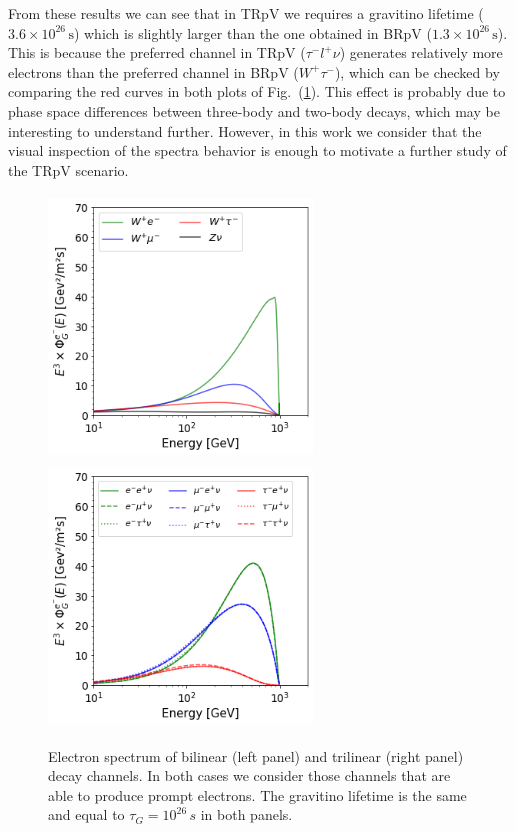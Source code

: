 \documentclass[a4paper,11pt]{article}
\begin{document}
From these results we can see that in TRpV we requires a gravitino lifetime ($3.6\times10^{26}\,\text{s}$) which is slightly larger than the one obtained in BRpV ($1.3\times10^{26}\,\text{s}$). This is because the preferred channel in TRpV ($\tau^{-} l^{+}\nu$) generates relatively more electrons than the preferred channel in BRpV ($W^{+} \tau^{-}$), which can be checked by comparing the red curves in both plots of Fig.~(\ref{fig:electron-spectrum}). This effect is probably due to phase space differences between three-body and two-body decays, which may be interesting to understand further. However, in this work we consider that the visual inspection of the spectra behavior is enough to motivate a further study of the TRpV scenario.

\begin{figure}[htb]
\begin{center}
\includegraphics[height=7cm,width=7cm,angle=0]{Figures/bilinear-lepton.png}
\includegraphics[height=7cm,width=7cm,angle=0]{Figures/trilinear-lepton.png}
\caption{Electron spectrum of bilinear (left panel) and trilinear (right panel) decay channels. In both cases we consider those channels that are able to produce prompt electrons. The gravitino lifetime is the same and equal to $\tau_G = 10^{26}\,s$ in both panels.}
\label{fig:electron-spectrum}
\end{center}
\end{figure}
\end{document}

